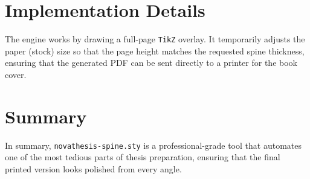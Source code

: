 \section{Implementation Details}
The engine works by drawing a full-page \texttt{TikZ} overlay. It temporarily adjusts the paper (stock) size so that the page height matches the requested spine thickness, ensuring that the generated PDF can be sent directly to a printer for the book cover.

\section{Summary}
In summary, \texttt{novathesis-spine.sty} is a professional-grade tool that automates one of the most tedious parts of thesis preparation, ensuring that the final printed version looks polished from every angle.
